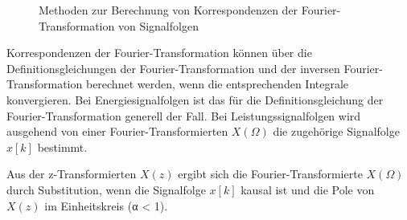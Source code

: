 \begin{figure}
  \centering
  
  \caption{Methoden zur Berechnung von Korrespondenzen der Fourier-Transformation von Signalfolgen}
  \label{fig:7.21}
\end{figure}

Korrespondenzen der Fourier-Transformation können über die Definitionsgleichungen der Fourier-Transformation und der inversen Fourier-Transformation berechnet werden, wenn die entsprechenden Integrale konvergieren. Bei Energiesignalfolgen ist das für die Definitionsgleichung der Fourier-Transformation generell der Fall. Bei Leistungssignalfolgen wird ausgehend von einer Fourier-Transformierten \(X(Ω)\) die zugehörige Signalfolge \(x[k]\) bestimmt.

Aus der z-Transformierten \(X(z)\) ergibt sich die Fourier-Transformierte \(X(Ω)\) durch Substitution, wenn die Signalfolge \(x[k]\) kausal ist und die Pole von \(X(z)\) im Einheitskreis (\textbar α\textbar{} \textless{} 1).
